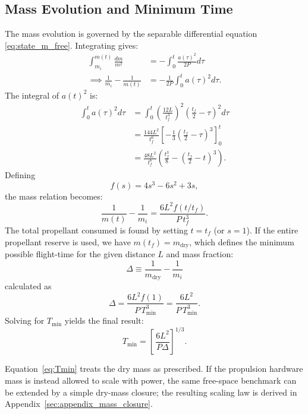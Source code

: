 \documentclass[journal,a4paper]{IEEEtran}
\begin{document}
\subsection{Mass Evolution and Minimum Time}
The mass evolution is governed by the separable differential equation \eqref{eq:state_m_free}. Integrating gives:
\begin{align}
    \int_{m_i}^{m(t)} \frac{dm}{m^2} &= -\int_0^t \frac{a(\tau)^2}{2P} d\tau \nonumber\\
    \implies \frac{1}{m_i} - \frac{1}{m(t)} &= -\frac{1}{2P} \int_0^t a(\tau)^2 d\tau.
\end{align}
The integral of $a(t)^2$ is:
\begin{align}
    \int_0^t a(\tau)^2 d\tau &= \int_0^t \left(\frac{12L}{t_f^3}\right)^2 \left(\frac{t_f}{2}-\tau\right)^2 d\tau \nonumber\\
    &= \frac{144L^2}{t_f^6} \left[-\frac{1}{3}\left(\frac{t_f}{2}-\tau\right)^3\right]_0^t \nonumber\\
    &= \frac{48L^2}{t_f^6} \left(\frac{t_f^3}{8} - \left(\frac{t_f}{2}-t\right)^3 \right).
\end{align}
Defining
\begin{equation}
f(s)=4s^{3}- 6s^{2}+3s,\label{eq:fdef}
\end{equation}
the mass relation becomes:
\begin{equation}
  \frac{1}{m(t)}-\frac{1}{m_i}
      =\frac{6L^{2}f(t/t_f)}{P\,t_f^{3}}.
  \label{eq:m_free}
\end{equation}
The total propellant consumed is found by setting $t=t_f$ (or $s=1$). If the entire propellant reserve is used, we have $m(t_f)=m_\mathrm{dry}$, which defines the minimum possible flight-time for the given distance $L$ and mass fraction:
\begin{equation}
  \Delta\equiv\frac{1}{m_\mathrm{dry}}-\frac{1}{m_i}
\end{equation}
calculated as
\begin{equation}
  \Delta = \frac{6L^{2}f(1)}{P\,T_{\min}^{3}} = \frac{6L^2}{P\,T_{\min}^3}.
\end{equation}
Solving for $T_{\min}$ yields the final result:
\begin{equation}
  T_{\min}= \left[\,
       \frac{6L^{2}}
             {P\Delta}
       \right]^{1/3}.
  \label{eq:Tmin}
\end{equation}

Equation~\eqref{eq:Tmin} treats the dry mass as prescribed. If the propulsion hardware mass is instead allowed to scale with power, the same free-space benchmark can be extended by a simple dry-mass closure; the resulting scaling law is derived in Appendix~\ref{sec:appendix_mass_closure}.
\end{document}
